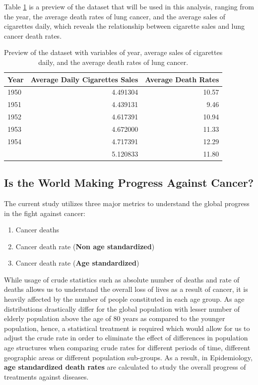 \documentclass[11pt,a4paper,]{article}
\providecommand{\tightlist}{%
  \setlength{\itemsep}{0pt}\setlength{\parskip}{0pt}}
\begin{document}
Table \ref{tab:table1} is a preview of the dataset that will be used in this analysis, ranging from the year, the average death rates of lung cancer, and the average sales of cigarettes daily, which reveals the relationship between cigarette sales and lung cancer death rates.

\newpage

\begin{table}

\caption{\label{tab:table1}Preview of the dataset with variables of year, average sales of cigarettes daily, and the average death rates of lung cancer.}
\centering
\begin{tabular}[t]{lrr}
\toprule
Year & Average Daily Cigarettes Sales & Average Death Rates\\
\midrule
1950 & 4.491304 & 10.57\\
1951 & 4.439131 & 9.46\\
1952 & 4.617391 & 10.94\\
1953 & 4.672000 & 11.33\\
1954 & 4.717391 & 12.29\\
\addlinespace
1955 & 5.120833 & 11.80\\
\bottomrule
\end{tabular}
\end{table}

\hypertarget{is-the-world-making-progress-against-cancer}{%
\subsection{Is the World Making Progress Against Cancer?}\label{is-the-world-making-progress-against-cancer}}

The current study utilizes three major metrics to understand the global progress in the fight against cancer:

\begin{enumerate}
\def\labelenumi{\arabic{enumi}.}
\tightlist
\item
  Cancer deaths
\item
  Cancer death rate (\textbf{Non age standardized})
\item
  Cancer death rate (\textbf{Age standardized})
\end{enumerate}

While usage of crude statistics such as absolute number of deaths and rate of deaths allows us to understand the overall loss of lives as a result of cancer, it is heavily affected by the number of people constituted in each age group. As age distributions drastically differ for the global population with lesser number of elderly population above the age of 80 years as compared to the younger population, hence, a statistical treatment is required which would allow for us to adjust the crude rate in order to eliminate the effect of differences in population age structures when comparing crude rates for different periods of time, different geographic areas or different population sub-groups. As a result, in Epidemiology, \textbf{age standardized death rates} are calculated to study the overall progress of treatments against diseases.
\end{document}
